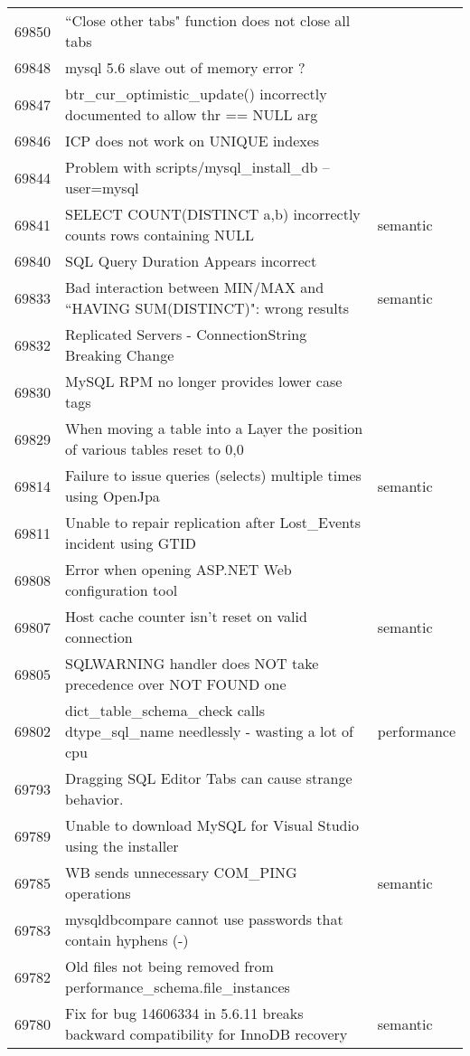 \begin{longtable}[c]{p{1cm}p{8cm}p{3cm}}
69850 & ``Close other tabs" function does not close all tabs &  \\
69848 & mysql 5.6 slave out of memory error ? &  \\
69847 & btr\_cur\_optimistic\_update() incorrectly documented to allow thr == NULL arg &  \\
69846 & ICP does not work on UNIQUE indexes &  \\
69844 & Problem with scripts/mysql\_install\_db --user=mysql &  \\
69841 & SELECT COUNT(DISTINCT a,b) incorrectly counts rows containing NULL & semantic \\
69840 & SQL Query Duration Appears incorrect &  \\
69833 & Bad interaction between MIN/MAX and ``HAVING SUM(DISTINCT)": wrong results & semantic \\
69832 & Replicated Servers - ConnectionString Breaking Change &  \\
69830 & MySQL RPM no longer provides lower case tags &  \\
69829 & When moving a table into a Layer the position of various tables reset to 0,0 &  \\
69814 & Failure to issue queries (selects) multiple times using OpenJpa & semantic \\
69811 & Unable to repair replication after Lost\_Events incident using GTID &  \\
69808 & Error when opening ASP.NET Web configuration tool &  \\
69807 & Host cache counter isn't reset on valid connection & semantic \\
69805 & SQLWARNING handler does NOT take precedence over NOT FOUND one &  \\
69802 & dict\_table\_schema\_check calls dtype\_sql\_name needlessly - wasting a lot of cpu & performance \\
69793 & Dragging SQL Editor Tabs can cause strange behavior. &  \\
69789 & Unable to download MySQL for Visual Studio using the installer &  \\
69785 & WB sends unnecessary COM\_PING operations & semantic \\
69783 & mysqldbcompare cannot use passwords that contain hyphens (-) &  \\
69782 & Old files not being removed from performance\_schema.file\_instances &  \\
69780 & Fix for bug 14606334 in 5.6.11 breaks backward compatibility for InnoDB recovery & semantic \\

\end{longtable}
